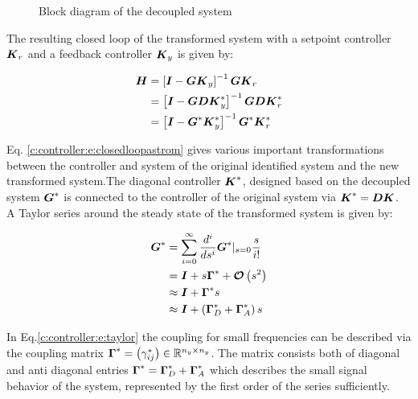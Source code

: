 \begin{figure}[h!]
\centering

\caption{Block diagram of the decoupled system}
\label{c:controller:f:decoupledsystem}
\end{figure}

The resulting closed loop of the transformed system with a setpoint controller $\mbox{\boldmath$K$}_r$ and a feedback controller $\mbox{\boldmath$K$}_y$ is given by: 

\begin{align}
\begin{split}
\mbox{\boldmath$H$} &=  \left[ \mbox{\boldmath$I$}  - \mbox{\boldmath$G$} \mbox{\boldmath$K$}_y \right]^{-1} \mbox{\boldmath$G$} \mbox{\boldmath$K$}_r \\
&= \left[ \mbox{\boldmath$I$}  - \mbox{\boldmath$G$} \mbox{\boldmath$D$} \mbox{\boldmath$K$}_y^* \right]^{-1} \mbox{\boldmath$G$} \mbox{\boldmath$D$} \mbox{\boldmath$K$}_r^* \\
	 &= \left[ \mbox{\boldmath$I$}  - \mbox{\boldmath$G$}^* \mbox{\boldmath$K$}_y^* \right]^{-1} \mbox{\boldmath$G$}^* \mbox{\boldmath$K$}_r^*
\end{split}
\label{c:controller:e:closedloopastrom}
\end{align}

Eq. \ref{c:controller:e:closedloopastrom} gives various important transformations between the controller and system of the original identified system and the new transformed system.The diagonal controller $\mbox{\boldmath$K$}^*$, designed based on the decoupled system $\mbox{\boldmath$G$}^*$ is connected to the controller of the original system via $\mbox{\boldmath$K$}^* = \mbox{\boldmath$D$} \mbox{\boldmath$K$}$.\\ 

A Taylor series around the steady state of the  transformed system is given by:

\begin{align}
\begin{split}
\mbox{\boldmath$G$}^* &= \sum_{i=0}^\infty \frac{d^i}{ds^i} \mbox{\boldmath$G$}^* |_{s=0} \frac{s}{i!} \\
&= \mbox{\boldmath$I$} + s \mbox{\boldmath$\Gamma$}^* + \mbox{\boldmath$\mathcal{O}$}\left(s^2\right) \\
&\approx \mbox{\boldmath$I$} +  \mbox{\boldmath$\Gamma$}^* s \\
&\approx \mbox{\boldmath$I$} + \left( \mbox{\boldmath$\Gamma$}^*_D + \mbox{\boldmath$\Gamma$}^*_A \right) s
\end{split}
\label{c:controller:e:taylor}
\end{align}

In Eq.\ref{c:controller:e:taylor} the coupling for small frequencies can be described via the coupling matrix $\mbox{\boldmath$\Gamma$}^* = \left( \gamma_{ij}^* \right)\in \mathbb{R}^{n_y \times n_y}$. The matrix consists both of diagonal and anti diagonal entries $\mbox{\boldmath$\Gamma$}^* = \mbox{\boldmath$\Gamma$}^*_D + \mbox{\boldmath$\Gamma$}^*_A$ which describes the small signal behavior of the system, represented by the first order of the series sufficiently.\\


